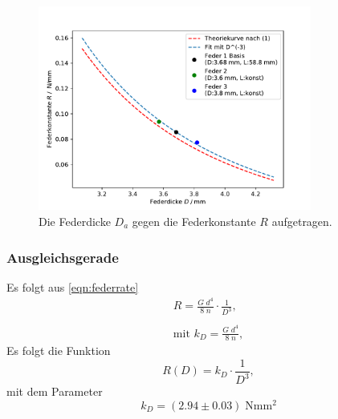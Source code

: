 \begin{figure}[H]
  \center
  \includegraphics[width=0.8\textwidth]{plots/dicke_konstante_dia.pdf}
  \caption{Die Federdicke $D_a$ gegen die Federkonstante $R$ aufgetragen.}
  \label{fig:R_D_dia}
\end{figure}

\subsubsection{Ausgleichsgerade}

Es folgt aus \ref{eqn:federrate}
\begin{align*}
  R=\frac{G\;d^4}{8\;n}\cdot \frac{1}{D^3}, \\\\  
  \text{mit }k_D =\frac{G\;d^4}{8\;n},
\end{align*}
Es folgt die Funktion
\begin{equation*}
  R(D)=k_D \cdot \frac{1}{D^3},
\end{equation*}
mit dem Parameter
\begin{equation*}
  k_D=(2.94 \pm 0.03) \;\si{\N\mm\squared}
\end{equation*}


